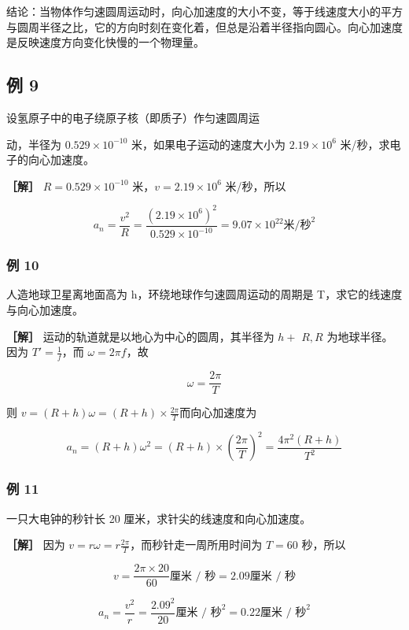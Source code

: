 结论：当物体作匀速圆周运动时，向心加速度的大小不变，等于线速度大小的平方与圆周半径之比，它的方向时刻在变化着，但总是沿着半径指向圆心。向心加速度是反映速度方向变化快慢的一个物理量。

\subsection{例 9}\label{ux4f8b-9-7}

设氢原子中的电子绕原子核（即质子）作匀速圆周运

动，半径为 \(0.529 \times 10^{-10}\) 米，如果电子运动的速度大小为
\(2.19 \times 10^{6}\) 米/秒，求电子的向心加速度。

\textbf{［解］} \(R = 0.529 \times 10^{-10}\)
米，\(v = 2.19 \times 10^{6}\) 米/秒，所以

\[
a _ {n} = \frac {v ^ {2}}{R} = \frac {(2.19 \times 10 ^ {6}) ^ {2}}{0.529 \times 10 ^ {- 10}} = 9.07 \times 10 ^ {22} \text{米/秒} ^ {2}
\]

\subsubsection{例 10}\label{ux4f8b-10-6}

人造地球卫星离地面高为 h，环绕地球作匀速圆周运动的周期是
T，求它的线速度与向心加速度。

\textbf{［解］} 运动的轨道就是以地心为中心的圆周，其半径为 \(h+\)
\(R, R\) 为地球半径。因为 \(T' = \frac{1}{f}\)，而
\(\omega = 2\pi f\)，故

\[
\omega = \frac {2 \pi}{T}
\]

则 \(v = (R + h)\omega = (R + h)\times \frac{2\pi}{T}\)而向心加速度为

\[
a _ {n} = (R + h) \omega^ {2} = (R + h) \times \left(\frac {2 \pi}{T}\right) ^ {2} = \frac {4 \pi^ {2} (R + h)}{T ^ {2}}
\]

\subsubsection{例 11}\label{ux4f8b-11-5}

一只大电钟的秒针长 20 厘米，求针尖的线速度和向心加速度。

\textbf{［解］} 因为
\(v = r\omega = r\frac{2\pi}{T}\)，而秒针走一周所用时间为 \(T = 60\)
秒，所以

\[
v = \frac {2 \pi \times 20}{60} \text{厘米 / 秒} = 2.09 \text{厘米 / 秒}
\]

\[
a _ {n} = \frac {v ^ {2}}{r} = \frac {2.09 ^ {2}}{20} \text{厘米 / 秒} ^ {2} = 0.22 \text{厘米 / 秒} ^ {2}
\]

